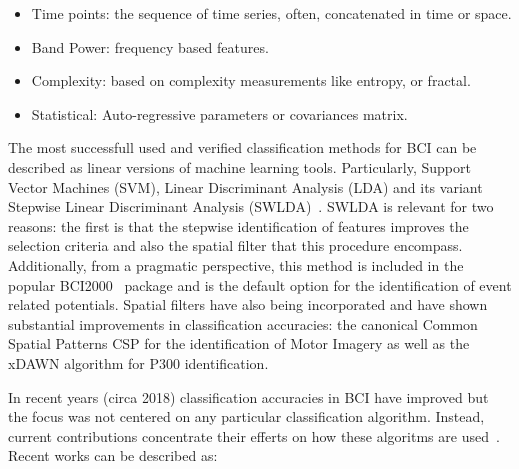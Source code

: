 \begin{itemize}
\item Time points:  the sequence of time series, often, concatenated in time or space.
\item Band Power: frequency based features.
\item Complexity:  based on complexity measurements like entropy, or fractal.
\item Statistical: Auto-regressive parameters or covariances matrix.
\end{itemize}

The most successfull used and verified classification methods for BCI \cite{Lotte2007} can be described as linear versions of machine learning tools.  Particularly, Support Vector Machines (SVM), Linear Discriminant Analysis (LDA) and its variant Stepwise Linear Discriminant Analysis (SWLDA)~\cite{Krusienski2006,Scholkopf2001}.  SWLDA is relevant for two reasons:  the first is that the stepwise identification of features improves the selection criteria and also the spatial filter that this procedure encompass.  Additionally, from a pragmatic perspective, this method is included in the popular BCI2000~\cite{Schalk2004} package and is the default option for the identification of event related potentials.  Spatial filters have also being incorporated and have shown substantial improvements in classification accuracies: the canonical Common Spatial Patterns CSP for the identification of Motor Imagery as well as the xDAWN algorithm for P300 identification.

In recent years (circa 2018) classification accuracies in BCI have improved but the focus was not centered on any particular classification algorithm.  Instead, current contributions concentrate their efferts on how these algoritms are used~\cite{Lotte2018}.  Recent works can be described as:

